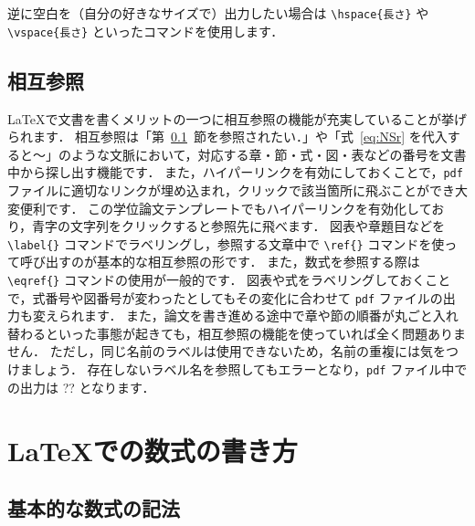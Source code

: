 逆に空白を（自分の好きなサイズで）出力したい場合は \verb|\hspace{長さ}| や \verb|\vspace{長さ}| といったコマンドを使用します．

\subsection{相互参照}
\label{ssec:ref}

\LaTeX で文書を書くメリットの一つに相互参照の機能が充実していることが挙げられます．
相互参照は「第~\ref{ssec:ref}~節を参照されたい．」や「式~\eqref{eq:NSr} を代入すると～」のような文脈において，対応する章・節・式・図・表などの番号を文書中から探し出す機能です．
また，ハイパーリンクを有効にしておくことで，\verb|pdf| ファイルに適切なリンクが埋め込まれ，クリックで該当箇所に飛ぶことができ大変便利です．
この学位論文テンプレートでもハイパーリンクを有効化しており，青字の文字列をクリックすると参照先に飛べます．
図表や章題目などを \verb|\label{}| コマンドでラベリングし，参照する文章中で \verb|\ref{}| コマンドを使って呼び出すのが基本的な相互参照の形です．
また，数式を参照する際は \verb|\eqref{}| コマンドの使用が一般的です．
図表や式をラベリングしておくことで，式番号や図番号が変わったとしてもその変化に合わせて \verb|pdf| ファイルの出力も変えられます．
また，論文を書き進める途中で章や節の順番が丸ごと入れ替わるといった事態が起きても，相互参照の機能を使っていれば全く問題ありません．
ただし，同じ名前のラベルは使用できないため，名前の重複には気をつけましょう．
存在しないラベル名を参照してもエラーとなり，\verb|pdf| ファイル中での出力は ?? となります．


\section{\LaTeX での数式の書き方}
\label{sec:formula_in_LaTeX}

\subsection{基本的な数式の記法}
\label{ssec:basic_command}

